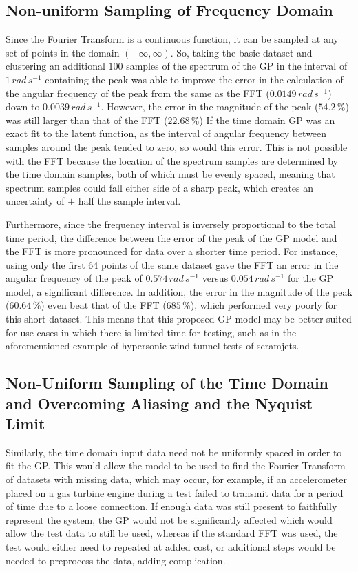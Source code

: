 \documentclass[12pt]{article}
\begin{document}
    \subsection{Non-uniform Sampling of Frequency Domain}
    Since the Fourier Transform is a continuous function, it can be sampled at any set of points in the domain $(-\infty, \infty)$.
     So, taking the basic dataset and clustering an additional $100$ samples of the spectrum of the GP in the interval of $1 \, rad \, s^{-1}$ containing the peak was able to improve the error in the calculation of the angular frequency of the peak from the same as the FFT ($0.0149 \, rad \, s^{-1}$) down to $0.0039 \, rad \, s^{-1} $.
    However, the error in the magnitude of the peak ($54.2 \, \%$) was still larger than that of the FFT ($22.68 \, \%$)
    If the time domain GP was an exact fit to the latent function, as the interval of angular frequency between samples around the peak tended to zero, so would this error.
    This is not possible with the FFT because the location of the spectrum samples are determined by the time domain samples, both of which must be evenly spaced, meaning that spectrum samples could fall either side of a sharp peak, which creates an uncertainty of $\pm$ half the sample interval.

    Furthermore, since the frequency interval is inversely proportional to the total time period, the difference between the error of the peak of the GP model and the FFT is more pronounced for data over a shorter time period.
    For instance, using only the first 64 points of the same dataset gave the FFT an error in the angular frequency of the peak of $0.574 \, rad \, s^{-1}$ versus $0.054 \, rad \, s^{-1}$ for the GP model, a significant difference.
    In addition, the error in the magnitude of the peak ($60.64 \, \%$) even beat that of the FFT ($685 \, \%$), which performed very poorly for this short dataset.
    This means that this proposed GP model may be better suited for use cases in which there is limited time for testing, such as in the aforementioned example of hypersonic wind tunnel tests of scramjets.

    \subsection{Non-Uniform Sampling of the Time Domain and Overcoming Aliasing and the Nyquist Limit}
    Similarly, the time domain input data need not be uniformly spaced in order to fit the GP\@.
    This would allow the model to be used to find the Fourier Transform of datasets with missing data, which may occur, for example, if an accelerometer placed on a gas turbine engine during a test failed to transmit data for a period of time due to a loose connection.
    If enough data was still present to faithfully represent the system, the GP would not be significantly affected which would allow the test data to still be used, whereas if the standard FFT was used, the test would either need to repeated at added cost, or additional steps would be needed to preprocess the data, adding complication.
\end{document}
